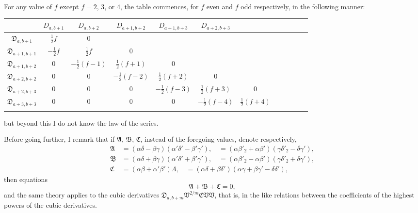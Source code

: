 \documentclass[11pt,a4paper]{book}
\begin{document}
\noindent For any value of $f$ except $f = 2$, $3$, or $4$, the table commences, for $f$ even and $f$ odd respectively, in the following manner:
\medskip

\begin{center}
\begin{tabular}{c|c|c|c|c|c|c|c|c|c|c|c}
& $D_{a,b+1}$ & $D_{a,b+2}$ & $D_{a+1,b+2}$ & $D_{a+1,b+3}$ & $D_{a+2,b+3}$ & & & & & & \\
\hline
$\mathfrak{D}_{a,b+1}$ & $\frac{1}{2}f$ & $0$ & & & & & & & & & \\
$\mathfrak{D}_{a+1,b+1}$ & $-\frac{1}{2}f$ & $\frac{1}{2}f$ & $0$ & & & & & & & & \\
$\mathfrak{D}_{a+1,b+2}$ & $0$ & $-\frac{1}{2}(f-1)$ & $\frac{1}{2}(f+1)$ & $0$ & & & & & & & \\
$\mathfrak{D}_{a+2,b+2}$ & $0$ & $0$ & $-\frac{1}{2}(f-2)$ & $\frac{1}{2}(f+2)$ & $0$ & & & & & & \\
$\mathfrak{D}_{a+2,b+3}$ & $0$ & $0$ & $0$ & $-\frac{1}{2}(f-3)$ & $\frac{1}{2}(f+3)$ & $0$ & & & & & \\
$\mathfrak{D}_{a+3,b+3}$ & $0$ & $0$ & $0$ & $0$ & $-\frac{1}{2}(f-4)$ & $\frac{1}{2}(f+4)$ & & & & & \\
& & & & & & & & & & &
\end{tabular}
\end{center}
\medskip

but beyond this I do not know the law of the series.

Before going further, I remark that if $\mathfrak{A}$, $\mathfrak{B}$, $\mathfrak{C}$, instead of the foregoing values, denote respectively,
\begin{align*}
\mathfrak{A} &= (\alpha\delta - \beta\gamma)(\alpha'\delta' - \beta'\gamma'), \quad = (\alpha\beta'_2 + \alpha\beta')(\gamma\delta'_2 - \delta\gamma'), \\
\mathfrak{B} &= (\alpha\delta + \beta\gamma)(\alpha'\delta' + \beta'\gamma'), \quad = (\alpha\beta'_2 - \alpha\beta')(\gamma\delta'_2 + \delta\gamma'), \\
\mathfrak{C} &= (\alpha\beta + \alpha'\beta')\Lambda, \quad = (\alpha\delta + \beta\delta')(\alpha\gamma + \beta\gamma' - \delta\delta'),
\end{align*}
then equations
\[
\mathfrak{A} + \mathfrak{B} + \mathfrak{C} = 0,
\]
and the same theory applies to the cubic derivatives $\mathfrak{D}_{a,b+m}\mathfrak{V}^{2/m}\mathfrak{C}\mathfrak{V}\mathfrak{V}$, that is, in the like relations between the coefficients of the highest powers of the cubic derivatives.
\end{document}
